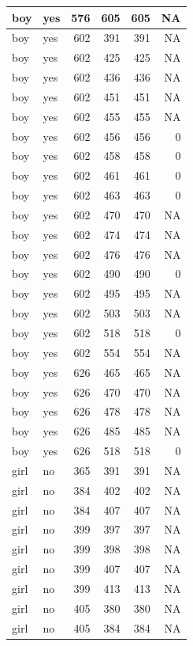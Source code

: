 \documentclass[man]{apa6}
\begin{document}
\begin{tabular}{l|l|r|r|r|r}
\hline
boy & yes & 576 & 605 & 605 & NA\\
\hline
boy & yes & 602 & 391 & 391 & NA\\
\hline
boy & yes & 602 & 425 & 425 & NA\\
\hline
boy & yes & 602 & 436 & 436 & NA\\
\hline
boy & yes & 602 & 451 & 451 & NA\\
\hline
boy & yes & 602 & 455 & 455 & NA\\
\hline
boy & yes & 602 & 456 & 456 & 0\\
\hline
boy & yes & 602 & 458 & 458 & 0\\
\hline
boy & yes & 602 & 461 & 461 & 0\\
\hline
boy & yes & 602 & 463 & 463 & 0\\
\hline
boy & yes & 602 & 470 & 470 & NA\\
\hline
boy & yes & 602 & 474 & 474 & NA\\
\hline
boy & yes & 602 & 476 & 476 & NA\\
\hline
boy & yes & 602 & 490 & 490 & 0\\
\hline
boy & yes & 602 & 495 & 495 & NA\\
\hline
boy & yes & 602 & 503 & 503 & NA\\
\hline
boy & yes & 602 & 518 & 518 & 0\\
\hline
boy & yes & 602 & 554 & 554 & NA\\
\hline
boy & yes & 626 & 465 & 465 & NA\\
\hline
boy & yes & 626 & 470 & 470 & NA\\
\hline
boy & yes & 626 & 478 & 478 & NA\\
\hline
boy & yes & 626 & 485 & 485 & NA\\
\hline
boy & yes & 626 & 518 & 518 & 0\\
\hline
girl & no & 365 & 391 & 391 & NA\\
\hline
girl & no & 384 & 402 & 402 & NA\\
\hline
girl & no & 384 & 407 & 407 & NA\\
\hline
girl & no & 399 & 397 & 397 & NA\\
\hline
girl & no & 399 & 398 & 398 & NA\\
\hline
girl & no & 399 & 407 & 407 & NA\\
\hline
girl & no & 399 & 413 & 413 & NA\\
\hline
girl & no & 405 & 380 & 380 & NA\\
\hline
girl & no & 405 & 384 & 384 & NA\\

\end{tabular}
\end{document}
